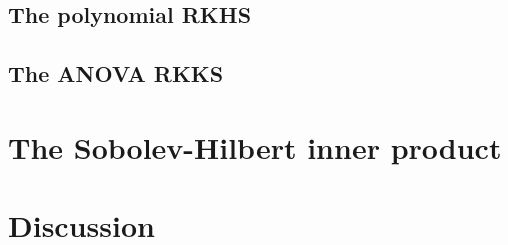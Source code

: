 \documentclass[a4paper,showframe,11pt,draft]{report}
\begin{document}
\subsection{The polynomial RKHS}

\subsection{The ANOVA RKKS}


\section{The Sobolev-Hilbert inner product}

\section{Discussion}





%

%
%
%
%
%
%
%


\hClosingStuffStandalone
\end{document}
